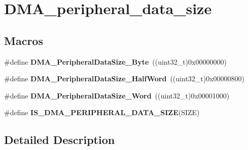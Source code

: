 \hypertarget{group___d_m_a__peripheral__data__size}{\section{D\-M\-A\-\_\-peripheral\-\_\-data\-\_\-size}
\label{group___d_m_a__peripheral__data__size}
}
\subsection*{Macros}
\begin{DoxyCompactItemize}
\item 
\hypertarget{group___d_m_a__peripheral__data__size_ga7577035ae4ff413164000227a8cea346}{\#define {\bfseries D\-M\-A\-\_\-\-Peripheral\-Data\-Size\-\_\-\-Byte}~((uint32\-\_\-t)0x00000000)}\label{group___d_m_a__peripheral__data__size_ga7577035ae4ff413164000227a8cea346}

\item 
\hypertarget{group___d_m_a__peripheral__data__size_gab1988e5005ee65c261018f62866e4585}{\#define {\bfseries D\-M\-A\-\_\-\-Peripheral\-Data\-Size\-\_\-\-Half\-Word}~((uint32\-\_\-t)0x00000800)}\label{group___d_m_a__peripheral__data__size_gab1988e5005ee65c261018f62866e4585}

\item 
\hypertarget{group___d_m_a__peripheral__data__size_ga516ea7a40945d8325fe73e079b245ea1}{\#define {\bfseries D\-M\-A\-\_\-\-Peripheral\-Data\-Size\-\_\-\-Word}~((uint32\-\_\-t)0x00001000)}\label{group___d_m_a__peripheral__data__size_ga516ea7a40945d8325fe73e079b245ea1}

\item 
\#define {\bfseries I\-S\-\_\-\-D\-M\-A\-\_\-\-P\-E\-R\-I\-P\-H\-E\-R\-A\-L\-\_\-\-D\-A\-T\-A\-\_\-\-S\-I\-Z\-E}(S\-I\-Z\-E)
\end{DoxyCompactItemize}


\subsection{Detailed Description}


